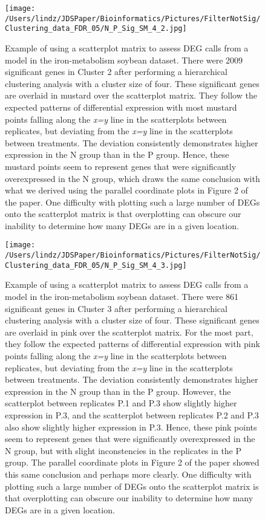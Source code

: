 \documentclass{article}
\begin{document}
\begin{figure}[!p]
\centerline{\texttt{[image: /Users/lindz/JDSPaper/Bioinformatics/Pictures/FilterNotSig/Clustering\_data\_FDR\_05/N\_P\_Sig\_SM\_4\_2.jpg]}}
\caption{Example of using a scatterplot matrix to assess DEG calls from a model in the iron-metabolism soybean dataset. There were 2009 significant genes in Cluster 2 after performing a hierarchical clustering analysis with a cluster size of four. These significant genes are overlaid in mustard over the scatterplot matrix. They follow the expected patterns of differential expression with most mustard points falling along the \textit{x=y} line in the scatterplots between replicates, but deviating from the \textit{x=y} line in the scatterplots between treatments. The deviation consistently demonstrates higher expression in the N group than in the P group. Hence, these mustard points seem to represent genes that were significantly overexpressed in the N group, which draws the same conclusion with what we derived using the parallel coordinate plots in Figure 2 of the paper. One difficulty with plotting such a large number of DEGs onto the scatterplot matrix is that overplotting can obscure our inability to determine how many DEGs are in a given location.
\label{suppSMCluster2}}
\end{figure}
  
\begin{figure}[!p]
\centerline{\texttt{[image: /Users/lindz/JDSPaper/Bioinformatics/Pictures/FilterNotSig/Clustering\_data\_FDR\_05/N\_P\_Sig\_SM\_4\_3.jpg]}}
\caption{Example of using a scatterplot matrix to assess DEG calls from a model in the iron-metabolism soybean dataset. There were 861 significant genes in Cluster 3 after performing a hierarchical clustering analysis with a cluster size of four. These significant genes are overlaid in pink over the scatterplot matrix. For the most part, they follow the expected patterns of differential expression with pink points falling along the \textit{x=y} line in the scatterplots between replicates, but deviating from the \textit{x=y} line in the scatterplots between treatments. The deviation consistently demonstrates higher expression in the N group than in the P group. However, the scatterplot between replicates P.1 and P.3 show slightly higher expression in P.3, and the scatterplot between replicates P.2 and P.3 also show slightly higher expression in P.3. Hence, these pink points seem to represent genes that were significantly overexpressed in the N group, but with slight inconstencies in the replicates in the P group. The parallel coordinate plots in Figure 2 of the paper showed this same conclusion and perhaps more clearly. One difficulty with plotting such a large number of DEGs onto the scatterplot matrix is that overplotting can obscure our inability to determine how many DEGs are in a given location.
\label{suppSMCluster3}}
\end{figure}  
  
\end{document}

